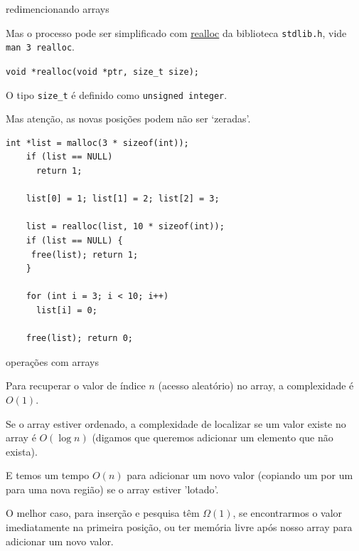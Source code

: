 \documentclass{beamer}
\begin{document}
\begin{frame}{redimencionando arrays}

  Mas o processo pode ser simplificado com
  \href{https://linux.die.net/man/3/realloc}{realloc} da biblioteca
  \texttt{stdlib.h}, vide \texttt{man 3 realloc}.

  \texttt{void *realloc(void *ptr, size\_t size);}

  O tipo \texttt{size\_t} é definido como {\color{teal} \texttt{unsigned integer}}.

  Mas atenção, as novas posições podem não ser `zeradas'.

  \framebreak

  \begin{lstlisting}[style=normalc,caption=list2.c]
    int *list = malloc(3 * sizeof(int));
    if (list == NULL)
      return 1;

    list[0] = 1; list[1] = 2; list[2] = 3;

    list = realloc(list, 10 * sizeof(int));
    if (list == NULL) {
     free(list); return 1;
    }

    for (int i = 3; i < 10; i++)
      list[i] = 0;

    free(list); return 0;
  \end{lstlisting}
  
\end{frame}


\begin{frame}[allowframebreaks]{operações com arrays}

  Para recuperar o valor de índice $n$ (acesso aleatório) no array, a
  complexidade é $O(1)$.

  Se o array estiver ordenado, a complexidade de localizar se um valor
  existe no array é $O(\log n)$ (digamos que queremos adicionar um
  elemento que não exista).

  E temos um tempo $O(n)$ para adicionar um novo valor (copiando um
  por um para uma nova região) se o array estiver 'lotado'.

  O melhor caso, para inserção e pesquisa têm $\Omega(1)$, se
  encontrarmos o valor imediatamente na primeira posição, ou ter
  memória livre após nosso array para adicionar um novo valor.

\end{frame}
\end{document}
